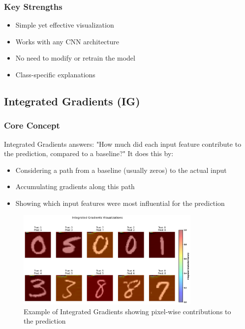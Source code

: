 \documentclass{article}
\begin{document}
\subsubsection{Key Strengths}
\begin{itemize}
    \item Simple yet effective visualization
    \item Works with any CNN architecture
    \item No need to modify or retrain the model
    \item Class-specific explanations
\end{itemize}

\subsection{Integrated Gradients (IG)}

\subsubsection{Core Concept}
Integrated Gradients answers: "How much did each input feature contribute to the prediction, compared to a baseline?" It does this by:
\begin{itemize}
    \item Considering a path from a baseline (usually zeros) to the actual input
    \item Accumulating gradients along this path
    \item Showing which input features were most influential for the prediction
\end{itemize}

\begin{figure}[h]
    \centering
    \includegraphics[width=0.8\textwidth]{images/integrated_gradients.png}
    \caption{Example of Integrated Gradients showing pixel-wise contributions to the prediction}
    \label{fig:integrated_gradients}
\end{figure}
\end{document}
